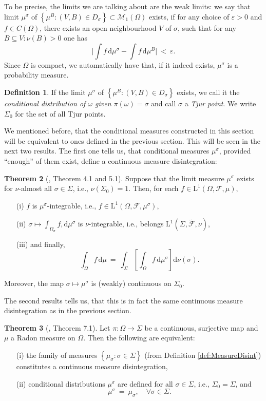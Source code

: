 \documentclass[12pt]{article}
\renewcommand{\d}{\mathrm{d}}
\newcommand{\F}{\mathcal{F}}
\newcommand{\M}{\mathcal{M}}
\newcommand{\set}[1]{\left\{#1\right\}}
\newcommand{\oglati}[1]{\left[#1\right]}
\newcommand{\ra}{\rightarrow}
\newcommand{\1}{\mathbbm{1}}
\newcommand{\5}{\vspace{0.5cm}}
\renewcommand{\tilde}{\widetilde}
\theoremstyle{definition}
\newtheorem{thm}{Theorem}[section]
\newtheorem{df}[thm]{Definition}
\begin{document}
To be precise, the limits we are talking about are the weak limits: we say that limit $\mu^\sigma$ of $\set{\mu^B:(V,B)\in D_\sigma}\subset\M_1(\Omega)$ exists, if for any choice of $\varepsilon>0$ and $f\in C(\Omega)$, there exists an open neighbourhood $V$ of $\sigma$, such that for any $B\subseteq V:\nu(B)>0$ one has
$$\Big|\int f\,\d\mu^\sigma-\int f\,\d\mu^B\Big| ~<~ \varepsilon.$$
Since $\Omega$ is compact, we automatically have that, if it indeed exists, $\mu^\sigma$ is a probability measure.

\begin{df} 
If the limit $\mu^\sigma$ of $\set{\mu^B:(V,B)\in D_\sigma}$ exists, we call it the \textit{conditional distribution of $\omega$ given $\pi(\omega)=\sigma$} and call $\sigma$ a \textit{Tjur point}. We write $\Sigma_0$ for the set of all Tjur points.
\end{df}

We mentioned before, that the conditional measures constructed in this section will be equivalent to ones defined in the previous section. This will be seen in the next two results. The first one tells us, that conditional measures $\mu^\sigma$, provided ``enough'' of them exist, define a continuous measure disintegration:

\begin{thm}[\cite{Tju}, Theorem 4.1 and 5.1]
Suppose that the limit measure $\mu^\sigma$ exists for $\nu$-almost all $\sigma\in\Sigma$, i.e., $\nu(\Sigma_0)=1$. Then, for each $f\in\mathrm{L}^1(\Omega,\F,\mu)$,
\begin{itemize}
	\item[(i)] $f$ is $\mu^\sigma$-integrable, i.e., $f\in\mathrm{L}^1(\Omega,\F,\mu^\sigma)$, 
	\item[(ii)] $\sigma\mapsto\int_{\Omega_\sigma}f,\d\mu^\sigma$ is $\nu$-integrable, i.e., belongs $\mathrm{L}^1(\Sigma,\tilde{\F},\nu)$, 
	\item[(iii)] and finally,
	$$\int_\Omega f\,\d\mu ~=~ \int_\Sigma\!\oglati{\int_\Omega f\,\d\mu^\sigma}\!\d\nu(\sigma).$$
\end{itemize}
Moreover, the map $\sigma\mapsto\mu^\sigma$ is (weakly) continuous on $\Sigma_0$.
\end{thm}
The second results tells us, that this is in fact the same continuous measure disintegration as in the previous section.
\begin{thm}[\cite{Tju}, Theorem 7.1]
Let $\pi:\Omega\ra\Sigma$ be a continuous, surjective map and $\mu$ a Radon measure on $\Omega$. Then the following are equivalent:
\begin{itemize}
	\item[(i)] the family of measures $\set{\mu_\sigma:\sigma\in\Sigma}$ (from Definition \ref{def:MeasureDisint}) constitutes a continuous measure disintegration,
	\item[(ii)] conditional distributions $\mu^\sigma$ are defined for all $\sigma\in\Sigma$, i.e., $\Sigma_0=\Sigma$, and
	$$\mu^\sigma ~=~ \mu_\sigma, \quad \forall \sigma\in\Sigma.$$
\end{itemize}
\end{thm}
\end{document}
